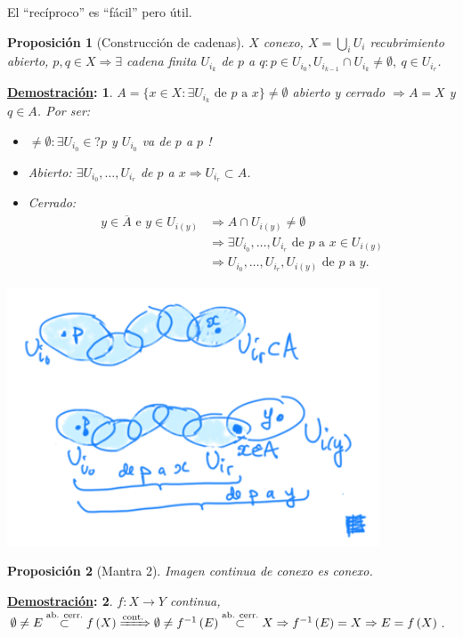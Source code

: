 \documentclass[10pt,a4paper,openright]{book}
\theoremstyle{break}
\newtheorem*{prop}{Proposición}
\newtheorem*{demo}{\underline{Demostración}:}
\begin{document}
El ``recíproco'' es ``fácil'' pero útil.
\begin{prop}[Construcción de cadenas]
$X$ conexo, $X = \bigcup_{i} U_i$ recubrimiento abierto, $p, q \in X \Rightarrow \exists$ cadena finita $U_{i_k}$ de $p$ a $q: p \in U_{i_0}, U_{i_{k - 1}} \cap U_{i_k} \neq \emptyset,\ q \in U_{i_r}$. 
\end{prop}
\begin{demo}
$A = \{x \in X: \exists U_{i_k} \text{ de } p \text{ a } x\} \neq \emptyset$ abierto y cerrado $\Rightarrow A = X$ y $q \in A$. Por ser:
\begin{itemize}
    \item $\neq \emptyset: \exists U_{i_0} \in? p$ y $U_{i_0}$ va de $p$ a $p$ !
    \item Abierto: $\exists U_{i_0}, \ldots, U_{i_r}$ de $p$ a $x \Rightarrow U_{i_r} \subset A$.
    \item Cerrado: 
    \begin{align*}
        y \in \overline{A} \text{ e } y \in U_{i\left( y \right)} &\Rightarrow A \cap U_{i\left( y \right)} \neq \emptyset\\
        &\Rightarrow \exists U_{i_0}, \ldots, U_{i_r} \text{ de } p \text{ a } x\in U_{i\left( y \right)}\\
        &\Rightarrow U_{i_0}, \ldots, U_{i_r}, U_{i\left( y \right)} \text{ de } p \text{ a } y
    .\end{align*}
\end{itemize}
\begin{center}
    \includegraphics[scale=0.3]{images/dem_const_cadenas} 
\end{center}
\end{demo}

\begin{prop}[Mantra 2]
Imagen continua de conexo es conexo. 
\end{prop}
\begin{demo}
    $f: X \rightarrow Y$ continua, $\emptyset \neq E \stackrel{\text{ab. cerr.}}{\subset} f\left( X \right) \xRightarrow{\text{cont.}} \emptyset \neq f^{-1}\left( E \right) \stackrel{\text{ab. cerr.}}{\subset} X \Rightarrow f^{-1}\left( E \right) = X \Rightarrow E = f\left( X \right)$.
\end{demo}
\end{document}
